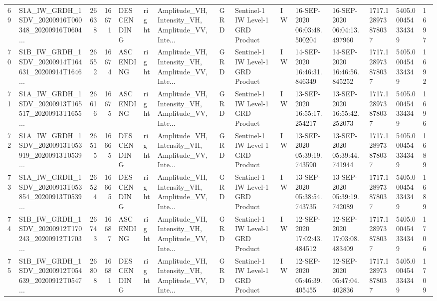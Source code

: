 \begin{tabular}{llrrlllllllllll}
69  &  S1A\_IW\_GRDH\_1SDV\_20200916T060348\_20200916T0604... &  26638 &   16671 &  DESCENDING &  right &  Amplitude\_VH, Intensity\_VH, Amplitude\_VV, Inte... &          GRD &  Sentinel-1 IW Level-1 GRD Product &              IW &  16-SEP-2020 06:03:48.500204 &  16-SEP-2020 06:04:13.497960 &          1717.128973878037 &  5405.000454334349 &       1697 \\
70  &  S1B\_IW\_GRDH\_1SDV\_20200914T164631\_20200914T1646... &  26552 &   16674 &   ASCENDING &  right &  Amplitude\_VH, Intensity\_VH, Amplitude\_VV, Inte... &          GRD &  Sentinel-1 IW Level-1 GRD Product &              IW &  14-SEP-2020 16:46:31.846349 &  14-SEP-2020 16:46:56.845252 &          1717.128973878037 &  5405.000454334349 &       1692 \\
71  &  S1A\_IW\_GRDH\_1SDV\_20200913T165517\_20200913T1655... &  26616 &   16675 &   ASCENDING &  right &  Amplitude\_VH, Intensity\_VH, Amplitude\_VV, Inte... &          GRD &  Sentinel-1 IW Level-1 GRD Product &              IW &  13-SEP-2020 16:55:17.254217 &  13-SEP-2020 16:55:42.252073 &          1717.128973878037 &  5405.000454334349 &       1696 \\
72  &  S1A\_IW\_GRDH\_1SDV\_20200913T053919\_20200913T0539... &  26515 &   16665 &  DESCENDING &  right &  Amplitude\_VH, Intensity\_VH, Amplitude\_VV, Inte... &          GRD &  Sentinel-1 IW Level-1 GRD Product &              IW &  13-SEP-2020 05:39:19.743590 &  13-SEP-2020 05:39:44.741944 &          1717.128973878037 &  5405.000454334349 &       1689 \\
73  &  S1A\_IW\_GRDH\_1SDV\_20200913T053854\_20200913T0539... &  26524 &   16665 &  DESCENDING &  right &  Amplitude\_VH, Intensity\_VH, Amplitude\_VV, Inte... &          GRD &  Sentinel-1 IW Level-1 GRD Product &              IW &  13-SEP-2020 05:38:54.743735 &  13-SEP-2020 05:39:19.742089 &          1717.128973878037 &  5405.000454334349 &       1689 \\
74  &  S1B\_IW\_GRDH\_1SDV\_20200912T170243\_20200912T1703... &  26743 &   16687 &   ASCENDING &  right &  Amplitude\_VH, Intensity\_VH, Amplitude\_VV, Inte... &          GRD &  Sentinel-1 IW Level-1 GRD Product &              IW &  12-SEP-2020 17:02:43.484512 &  12-SEP-2020 17:03:08.483409 &          1717.128973878037 &  5405.000454334349 &       1706 \\
75  &  S1B\_IW\_GRDH\_1SDV\_20200912T054639\_20200912T0547... &  26808 &   16681 &  DESCENDING &  right &  Amplitude\_VH, Intensity\_VH, Amplitude\_VV, Inte... &          GRD &  Sentinel-1 IW Level-1 GRD Product &              IW &  12-SEP-2020 05:46:39.405455 &  12-SEP-2020 05:47:04.402836 &          1717.128973878037 &  5405.000454334349 &       1709 \\

\end{tabular}
